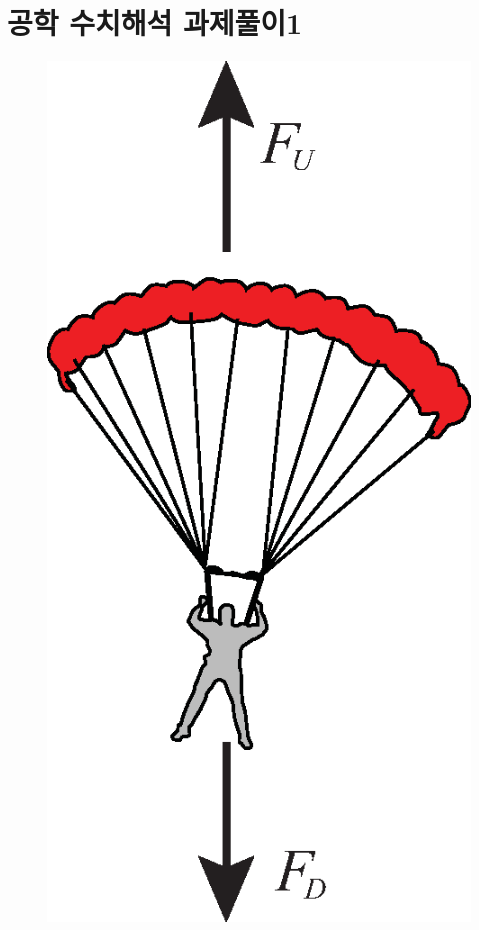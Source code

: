 \documentclass{article}
\numberwithin{equation}{section}
\theoremstyle{examplestyle}
\begin{document}
\section{공학 수치해석 과제풀이1}
\begin{figure}[!hbpt]
\centering
\includegraphics[keepaspectratio=true,width=0.2\linewidth]{figs/parachute.eps}
\label{fig:1-2}
\end{figure}
\end{document}
